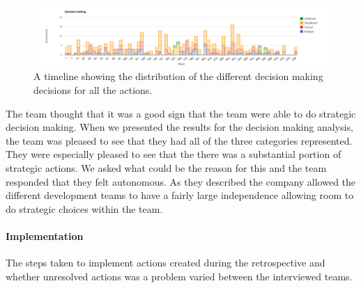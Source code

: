 \begin{table}[!h]
	\begin{center}
	\caption{Analysis results from the content analysis for the decision making perspective of the action.}
	\label{table:decision-making-results}
	\end{center}
\end{table}

\begin{figure}
	\centering
	\includegraphics[width=\textwidth, keepaspectratio]{figures/decision-l.png}
	\caption{A timeline showing the distribution of the different decision making decisions for all the actions.}
	\label{figure:decision-l}
\end{figure}

The team thought that it was a good sign that the team were able to do strategic decision making. When we presented the results for the decision making analysis, the team was pleased to see that they had all of the three categories represented. They were especially pleased to see that the there was a substantial portion of strategic actions. We asked what could be the reason for this and the team responded that they felt autonomous. As they described the company allowed the different development teams to have a fairly large independence allowing room to do strategic choices within the team. 

\paragraph{Implementation}
\label{question-6}
The steps taken to implement actions created during the retrospective and whether unresolved actions was a problem varied between the interviewed teams. 

